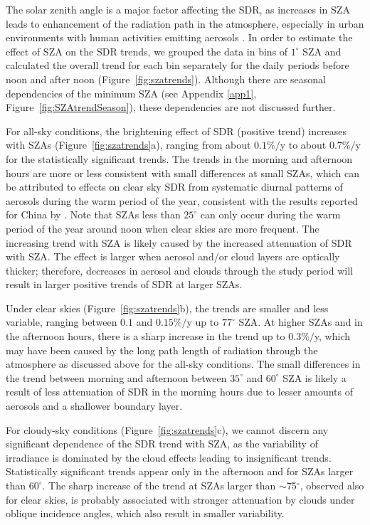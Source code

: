 \documentclass[applsci,article,accept,moreauthors,pdftex]{Definitions/mdpi}
\begin{document}
The solar zenith angle is a major factor affecting the SDR, as
increases in SZA leads to enhancement of the radiation path in the
atmosphere, especially in urban environments with human activities
emitting aerosols \citep{Wang2021}. In order to estimate the effect of
SZA on the SDR trends, we grouped the data in bins of \(1^\circ\) SZA
and calculated the overall trend for each bin separately for the daily
periods before noon and after noon (Figure~\ref{fig:szatrends}).
Although there are seasonal dependencies of the minimum SZA (see
Appendix \ref{app1}, Figure~\ref{fig:SZAtrendSeason}), these dependencies are not
discussed further.

For all-sky conditions, the brightening effect of SDR (positive trend)
increases with SZAs (Figure~\ref{fig:szatrends}a), ranging from about
\(0.1\%/\)y to about \(0.7\%/\)y for the statistically significant
trends. The trends in the morning and afternoon hours are more or less
consistent with small differences at small SZAs, which can be attributed
to effects on clear sky SDR from systematic diurnal patterns of aerosols
during the warm period of the year, consistent with the results
reported for China by \citet{Wang2021}. Note that SZAs less than
\(25^\circ\) can only occur during the warm period of the year around
noon when clear skies are more frequent. The increasing trend with SZA
is likely caused by the increased attenuation of SDR with SZA. The
effect is larger when aerosol and/or cloud layers are optically thicker;
therefore, decreases in aerosol and clouds through the study period will
result in larger positive trends of SDR at larger SZAs.

Under clear skies (Figure~\ref{fig:szatrends}b), the trends are
smaller and less variable, ranging between \(0.1\) and \(0.15\%/\)y up
to \(77^\circ\) SZA. At higher SZAs and in the afternoon hours, there is a
sharp increase in the trend up to \(0.3\%/\)y, which may have been
caused by the long path length of radiation through the atmosphere as
discussed above for the all-sky conditions. The small differences in the
trend between morning and afternoon between \(35^\circ\) and
\(60^\circ\) SZA is likely a result of less attenuation of SDR in the
morning hours due to lesser amounts of aerosols and a shallower boundary
layer.

For cloudy-sky conditions (Figure~\ref{fig:szatrends}c), we cannot
discern any significant dependence of the SDR trend with SZA, as the
variability of irradiance is dominated by the cloud effects leading to
insignificant trends. Statistically significant trends appear only in
the afternoon and for SZAs larger than \(60^\circ\). The sharp increase
of the trend at SZAs larger than $\sim${75}$^{\circ}$, observed also for
clear skies, is probably associated with stronger attenuation by clouds
under oblique incidence angles, which also result in smaller
variability.
\end{document}
